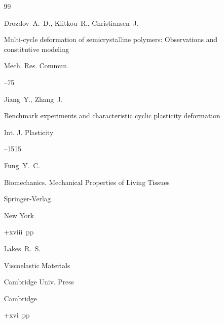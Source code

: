 \begin{thebibliography}{99}

\by Drozdov~A.~D., Klitkou~R., Christiansen~J.

\paper Multi-cycle deformation of semicrystalline polymers: Observations and constitutive modeling

\jour Mech. Res. Commun.



--75







\by Jiang~Y., Zhang~J.

\paper Benchmark experiments and characteristic cyclic plasticity deformation

\jour Int. J. Plasticity




--1515







\by Fung~Y.~C.

\book Biomechanics. Mechanical Properties of Living Tissues


\publ Springer-Verlag

\publaddr New York

+xviii~pp \nofrills







\by Lakes~R.~S.

\book Viscoelastic Materials


\publ Cambridge Univ. Press

\publaddr Cambridge

+xvi~pp \nofrills 








\end{thebibliography}
